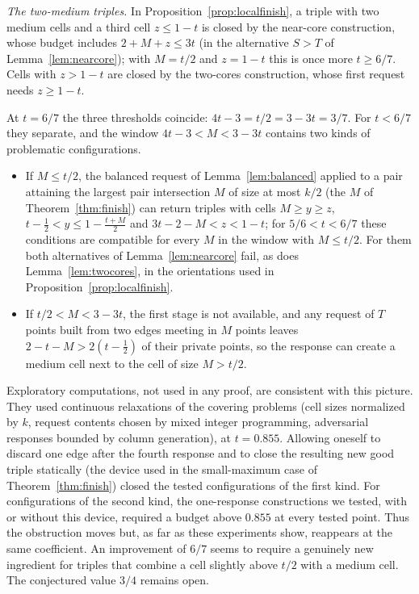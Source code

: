 \documentclass[11pt]{article}
\numberwithin{equation}{section}
\theoremstyle{definition}
\theoremstyle{remark}
\begin{document}
\emph{The two-medium triples.} In Proposition~\ref{prop:localfinish}, a
triple with two medium cells and a third cell $z\le1-t$ is closed by the
near-core construction, whose budget includes $2+M+z\le3t$ (in the
alternative $S>T$ of Lemma~\ref{lem:nearcore}); with $M=t/2$ and $z=1-t$
this is once more $t\ge6/7$. Cells with $z>1-t$ are closed by the
two-cores construction, whose first request needs $z\ge1-t$.

At $t=6/7$ the three thresholds coincide: $4t-3=t/2=3-3t=3/7$. For
$t<6/7$ they separate, and the window $4t-3<M<3-3t$ contains two kinds
of problematic configurations.
\begin{itemize}[leftmargin=2em]
\item If $M\le t/2$, the balanced request of Lemma~\ref{lem:balanced}
applied to a pair attaining the largest pair intersection $M$ of size at
most $k/2$ (the $M$ of Theorem~\ref{thm:finish}) can
return triples with cells $M\ge y\ge z$, $t-\tfrac12<y\le1-\tfrac{t+M}2$
and $3t-2-M<z<1-t$; for $5/6<t<6/7$ these conditions are compatible
for every $M$ in the window with $M\le t/2$. For them both alternatives of Lemma~\ref{lem:nearcore} fail,
as does Lemma~\ref{lem:twocores}, in the orientations used in
Proposition~\ref{prop:localfinish}.
\item If $t/2<M<3-3t$, the first stage is not available, and any request
of $T$ points built from two edges meeting in $M$ points leaves
$2-t-M>2(t-\tfrac12)$ of their private points, so the response can
create a medium cell next to the cell of size $M>t/2$.
\end{itemize}
Exploratory computations, not used in any proof, are consistent with
this picture. They used continuous relaxations of the covering problems
(cell sizes normalized by $k$, request contents chosen by mixed integer
programming, adversarial responses bounded by column generation), at
$t=0.855$. Allowing oneself to discard one edge after the fourth
response and to close the resulting new good triple statically (the
device used in the small-maximum case of Theorem~\ref{thm:finish})
closed the tested configurations of the first kind. For configurations
of the second kind, the one-response constructions we tested, with or
without this device, required a budget above $0.855$ at every tested
point. Thus the obstruction moves but, as far as these experiments show,
reappears at the same coefficient. An improvement of $6/7$ seems to require a genuinely new
ingredient for triples that combine a cell slightly above $t/2$ with a
medium cell. The conjectured value $3/4$ remains open.
\end{document}
